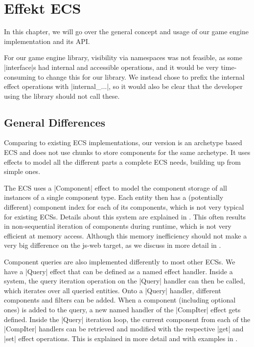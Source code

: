 \chapter{Effekt ECS}\label{chap:engine}

In this chapter, we will go over the general concept and usage of our game engine implementation and its API.

For our game engine library, visibility via namespaces was not feasible, as some |interface|s had internal and accessible operations, and it would be very time-consuming to change this for our library. We instead chose to prefix the internal effect operations with |internal_...|, so it would also be clear that the developer using the library should not call these.

\section{General Differences}

Comparing to existing ECS implementations, our version is an archetype based ECS and does not use chunks to store components for the same archetype. It uses effects to model all the different parts a complete ECS needs, building up from simple ones.

The ECS uses a |Component| effect to model the component storage of all instances of a single component type. Each entity then has a (potentially different) component index for each of its components, which is not very typical for existing ECSs. Details about this system are explained in . This often results in non-sequential iteration of components during runtime, which is not very efficient at memory access. Although this memory inefficiency should not make a very big difference on the \textsf{js-web} target, as we discuss in more detail in .

Component queries are also implemented differently to most other ECSs. We have a |Query| effect that can be defined as a named effect handler. Inside a system, the query iteration operation on the |Query| handler can then be called, which iterates over all queried entities. Onto a |Query| handler, different components and filters can be added. When a component (including optional ones) is added to the query, a new named handler of the |CompIter| effect gets defined. Inside the |Query| iteration loop, the current component from each of the |CompIter| handlers can be retrieved and modified with the respective |get| and |set| effect operations. This is explained in more detail and with examples in .

